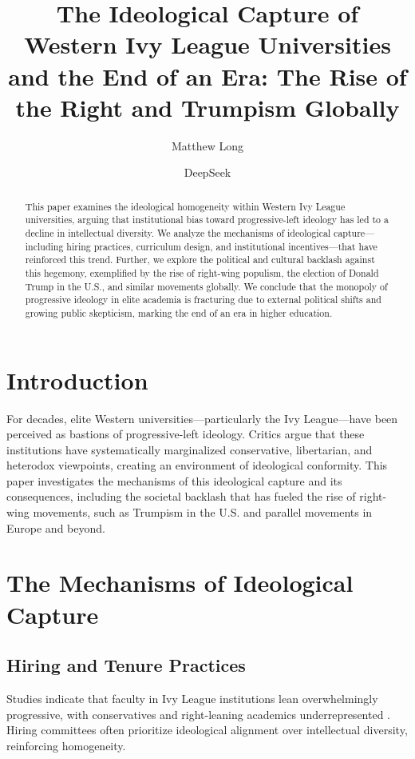 \documentclass[11pt]{article}
\title{The Ideological Capture of Western Ivy League Universities and the End of an Era: The Rise of the Right and Trumpism Globally}
\author[1]{Matthew Long}
\author[2]{DeepSeek}
\affil[1]{Independent Researcher \\ \texttt{matthewlong@example.com}}
\affil[2]{DeepSeek Research \\ \texttt{research@deepseek.com}}
\begin{document}
\maketitle

\begin{abstract}
    This paper examines the ideological homogeneity within Western Ivy League universities, arguing that institutional bias toward progressive-left ideology has led to a decline in intellectual diversity. We analyze the mechanisms of ideological capture—including hiring practices, curriculum design, and institutional incentives—that have reinforced this trend. Further, we explore the political and cultural backlash against this hegemony, exemplified by the rise of right-wing populism, the election of Donald Trump in the U.S., and similar movements globally. We conclude that the monopoly of progressive ideology in elite academia is fracturing due to external political shifts and growing public skepticism, marking the end of an era in higher education.
\end{abstract}


\section{Introduction}
For decades, elite Western universities—particularly the Ivy League—have been perceived as bastions of progressive-left ideology. Critics argue that these institutions have systematically marginalized conservative, libertarian, and heterodox viewpoints, creating an environment of ideological conformity. This paper investigates the mechanisms of this ideological capture and its consequences, including the societal backlash that has fueled the rise of right-wing movements, such as Trumpism in the U.S. and parallel movements in Europe and beyond.

\section{The Mechanisms of Ideological Capture}
\subsection{Hiring and Tenure Practices}
Studies indicate that faculty in Ivy League institutions lean overwhelmingly progressive, with conservatives and right-leaning academics underrepresented \cite{Gross2016}. Hiring committees often prioritize ideological alignment over intellectual diversity, reinforcing homogeneity.
\end{document}
